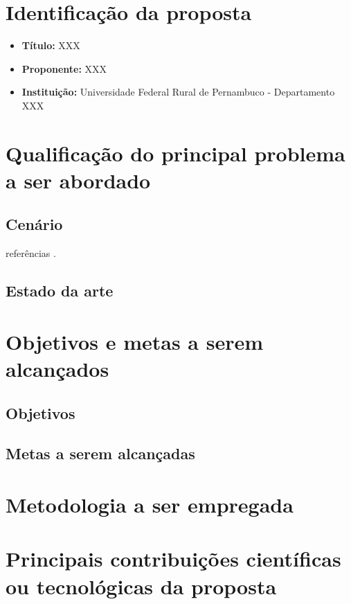\documentclass[a4paper,12pt]{article}
\begin{document}


\newpage
\tableofcontents

\newpage
\section{Identificação da proposta}
\label{sc:identificacao}
\begin{itemize}
\item{\textbf{Título:} XXX}
\item{\textbf{Proponente:} XXX}
\item{\textbf{Instituição:} Universidade Federal Rural de Pernambuco - Departamento XXX}
\end{itemize}



\newpage
\section{Qualificação do principal problema a ser abordado}
\label{sc:qualificacao}

\subsection{Cenário}
referências \cite{small}\cite{big}.
\subsection{Estado da arte}

\newpage
\section{Objetivos e metas a serem alcançados}
\label{sc:objetivos}

\subsection{Objetivos}
\subsection{Metas a serem alcançadas}

\newpage
\section{Metodologia a ser empregada}
\label{sc:metodologia}

\newpage
\section{Principais contribuições científicas ou tecnológicas da proposta}
\label{sc:contribuicoes}
\end{document}
